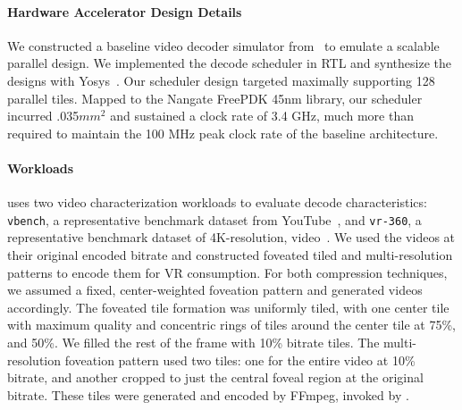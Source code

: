 \paragraph{Hardware Accelerator Design Details}
We constructed a baseline video decoder simulator from~\cite{hevcThesis} to emulate a scalable parallel design.
We implemented the \nameArch decode scheduler in RTL and synthesize the designs with Yosys~\cite{yosys}.
Our scheduler design targeted maximally supporting 128 parallel tiles.
Mapped to the Nangate FreePDK 45nm library, our scheduler incurred .035$mm^2$ and sustained a clock rate of 3.4 GHz, much more than required to maintain the 100 MHz peak clock rate of the baseline architecture.

\paragraph{Workloads}
\nameArchprof uses two video characterization workloads to evaluate decode characteristics: \texttt{vbench}, a representative benchmark dataset from YouTube~\cite{vbench}, and \texttt{vr-360}, a representative benchmark dataset of 4K-resolution, \threesixty video~\cite{vr360-mmsys17}.
We used the videos at their original encoded bitrate and constructed foveated tiled and multi-resolution patterns to encode them for VR consumption.
For both compression techniques, we assumed a fixed, center-weighted foveation pattern and generated videos accordingly.
The foveated tile formation was uniformly tiled, with one center tile with maximum quality and concentric rings of tiles around the center tile at 75\%, and 50\%.
We filled the rest of the frame with 10\% bitrate tiles.
The multi-resolution foveation pattern used two tiles: one for the entire video at 10\% bitrate, and another cropped to just the central foveal region at the original bitrate.
These tiles were generated and encoded by {FFmpeg}, invoked by \nameArchprof.
